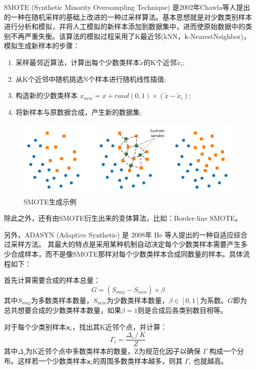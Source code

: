 \documentclass[a4paper]{article}
\begin{document}
SMOTE (Synthetic Minority Oversampling Technique) 是2002年Chawla等人提出的一种在随机采样的基础上改进的一种过采样算法\cite{Chawla2002SMOTE}。基本思想就是对少数类别样本进行分析和模拟，并将人工模拟的新样本添加到数据集中，进而使原始数据中的类别不再严重失衡。该算法的模拟过程采用了K最近邻(kNN，k-NearestNeighbor)，模拟生成新样本的步骤：
\begin{enumerate}
    \item 采样最邻近算法，计算出每个少数类样本$\tilde{x}$的K个近邻$\tilde{x}_i$;
    \item 从K个近邻中随机挑选N个样本进行随机线性插值;
    \item 构造新的少数类样本 $x_{new}=x+rand\left(0,1\right)\times\left(\tilde{x}-\tilde{x}_i   \right)$;
    \item 将新样本与原数据合成，产生新的数据集;
\end{enumerate}
\begin{figure}[!h]
    \centering
    \includegraphics[width=0.7\linewidth]{smote.png}
    \caption{SMOTE生成示例}
    \label{fig:smote}
\end{figure}


除此之外，还有由SMOTE衍生出来的变体算法，比如：Border-line SMOTE。

另外，ADASYN (Adaptive Synthetic) 
是 2008年 He 等人提出的一种自适应综合过采样方法\cite{he2008adasyn}。
其最大的特点是采用某种机制自动决定每个少数类样本需要产生多少合成样本，而不是像SMOTE那样对每个少数类样本合成同数量的样本。具体流程如下：

首先计算需要合成的样本总量：
\[ G = (S_{maj} - S_{min}) \times \beta \]
其中\(S_{maj}\)为多数类样本数量，\(S_{min}\)为少数类样本数量，\(\beta \in [0,1]\)为系数。$G$即为总共想要合成的少数类样本数量，如果\(\beta=1\)则是合成后各类别数目相等。
​

对于每个少类别样本\(\mathbf{x}_i\)，找出其K近邻个点，并计算：
\[ \Gamma_i = \frac{\Delta_i\,/\,K}{Z} \]
其中\(\Delta_i\)为K近邻个点中多数类样本的数量，Z为规范化因子以确保 \(\Gamma\) 构成一个分布。这样若一个少数类样本\(\mathbf{x}_i\)的周围多数类样本越多，则其 \(\Gamma_i\) 也就越高。
​
\end{document}

